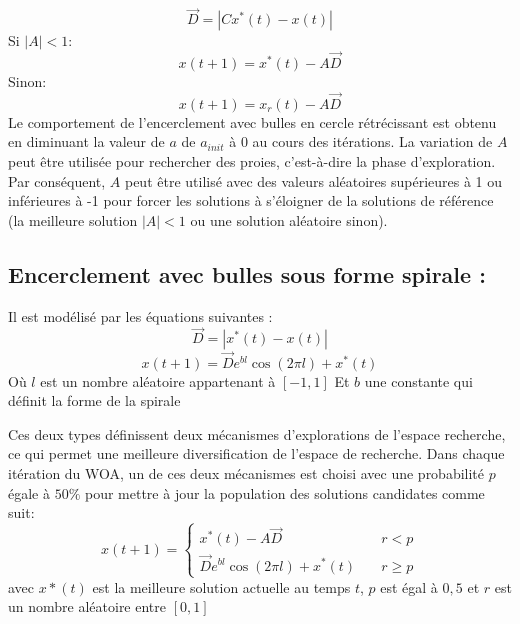 \documentclass[12pt]{article}
\begin{document}
\begin{equation*}
    \vec{D} = |Cx^*(t) - x(t)|
\end{equation*}
Si \(|A| < 1\):
\begin{equation}
    x(t+1) = x^*(t) - A\vec{D}
\end{equation}
Sinon:
\begin{equation}
    x(t+1) = x_r(t) - A\vec{D}
\end{equation}
Le comportement de l’encerclement avec bulles en cercle rétrécissant est obtenu en diminuant la valeur de \(a\) de \(a_{init}\) à 0 au cours des itérations. La variation de \(A\) peut être utilisée pour rechercher des proies, c'est-à-dire la phase d'exploration. Par conséquent, \(A\) peut être utilisé avec des valeurs aléatoires supérieures à 1 ou inférieures à -1 pour forcer les solutions à s'éloigner de la solutions de référence (la meilleure solution \(|A| < 1\) ou une solution aléatoire sinon).
\subsection{Encerclement avec bulles sous forme spirale :}
Il est modélisé par les équations suivantes :
\begin{equation}
    \vec{D} = |x^*(t) - x(t)|
\end{equation}
\begin{equation}
    x(t+1) = \vec{D} e^{bl} \cos (2\pi l) + x^*(t)
\end{equation}
Où \(l\) est un nombre aléatoire appartenant à \([-1,1]\) Et \(b\) une constante qui définit la forme de la spirale 

Ces deux types définissent deux mécanismes d’explorations de l’espace recherche, ce qui permet une meilleure diversification de l’espace de recherche.
Dans chaque itération du WOA, un de ces deux mécanismes est choisi avec une probabilité \(p\) égale à \(50\%\) pour mettre à jour la population des solutions candidates comme suit:
\[ x(t+1) =
  \begin{cases}
    x^*(t) - A\vec{D}       & \quad r < p\\
    \vec{D} e^{bl} \cos (2\pi l) + x^*(t)  & \quad r \geq p
  \end{cases}
\]
avec \(x*(t)\) est la meilleure solution actuelle au temps \(t\), \(p\) est égal à \(0,5\) et \(r\) est un nombre aléatoire entre \([0, 1]\)
\end{document}
